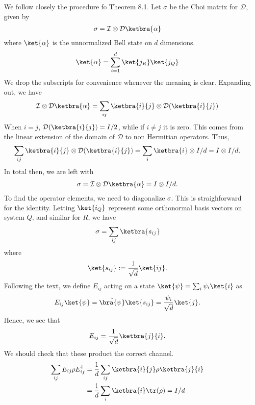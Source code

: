\documentclass{book}
\begin{document}
    We follow closely the procedure fo Theorem 8.1. Let $\sigma$ be the Choi matrix for $\mathcal{D}$, given by
    \begin{align}
        \sigma = \mathcal{I}\otimes\mathcal{D} \ketbra{\alpha}
    \end{align}
    where $\ket{\alpha}$ is the unnormalized Bell state on $d$ dimensions.
    \begin{align}
        \ket{\alpha} = \sum_{i=1}^d \ket{j_R}\ket{j_Q}
    \end{align}
    We drop the subscripts for convenience whenever the meaning is clear. Expanding out, we have
    \begin{align}
        \mathcal{I}\otimes\mathcal{D} \ketbra{\alpha} = \sum_{ij} \ketbra{i}{j} \otimes \mathcal{D}(\ketbra{i}{j})
    \end{align}
    When $i = j$, $\mathcal{D}(\ketbra{i}{j}) = I/2$, while if $i \neq j$ it is zero. This comes from the linear extension of the domain of $\mathcal{D}$ to non Hermitian operators. Thus, 
    \begin{align}
        \sum_{ij} \ketbra{i}{j} \otimes \mathcal{D}(\ketbra{i}{j}) = \sum_{i} \ketbra{i} \otimes I/d = I \otimes I /d.
    \end{align}
    In total then, we are left with 
        \begin{align}
        \sigma = \mathcal{I}\otimes\mathcal{D} \ketbra{\alpha} = I \otimes I/d.
    \end{align}
    To find the operator elements, we need to diagonalize $\sigma$. This is straighforward for the identity. Letting $\ket{i_Q}$ represent some orthonormal basis vectors on system $Q$, and similar for $R$, we have
    \begin{align}
        \sigma = \sum_{ij} \ketbra{s_{ij}}
    \end{align}
    where
    \begin{align}
        \ket{s_{ij}} := \frac{1}{\sqrt{d}} \ket{ij}.
    \end{align}
    Following the text, we define $E_{ij}$ acting on a state $\ket{\psi} = \sum_i \psi_i \ket{i}$ as 
    \begin{align}
        E_{ij}\ket{\psi} = \tilde{\bra{\psi}}\ket{s_{ij}} = \frac{\psi_i}{\sqrt{d}}\ket{j}.
    \end{align}
    Hence, we see that 
    \begin{align}
        E_{ij} = \frac{1}{\sqrt{d}}\ketbra{j}{i}.
    \end{align}
    We should check that these product the correct channel.
    \begin{align}
    \begin{aligned}
        \sum_{ij} E_{ij} \rho E_{ij}^\dagger &= \frac{1}{d} \sum_{ij} \ketbra{i}{j}\rho\ketbra{j}{i} \\
        &= \frac{1}{d} \sum_i \ketbra{i} \tr(\rho) = I/d
    \end{aligned}
    \end{align}
    
\end{document}
